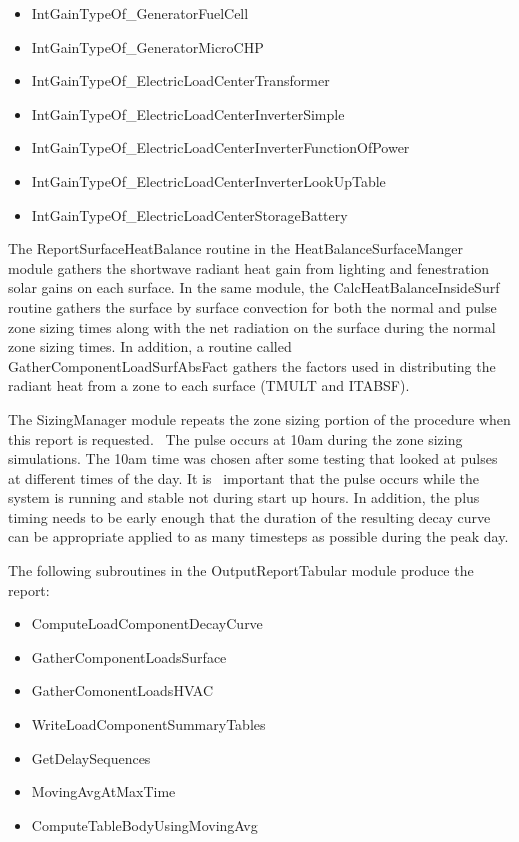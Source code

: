 \begin{itemize}
\item
  IntGainTypeOf\_GeneratorFuelCell
\item
  IntGainTypeOf\_GeneratorMicroCHP
\item
  IntGainTypeOf\_ElectricLoadCenterTransformer
\item
  IntGainTypeOf\_ElectricLoadCenterInverterSimple
\item
  IntGainTypeOf\_ElectricLoadCenterInverterFunctionOfPower
\item
  IntGainTypeOf\_ElectricLoadCenterInverterLookUpTable
\item
  IntGainTypeOf\_ElectricLoadCenterStorageBattery
\end{itemize}

The ReportSurfaceHeatBalance routine in the HeatBalanceSurfaceManger module gathers the shortwave radiant heat gain from lighting and fenestration solar gains on each surface. In the same module, the CalcHeatBalanceInsideSurf routine gathers the surface by surface convection for both the normal and pulse zone sizing times along with the net radiation on the surface during the normal zone sizing times. In addition, a routine called GatherComponentLoadSurfAbsFact gathers the factors used in distributing the radiant heat from a zone to each surface (TMULT and ITABSF).

The SizingManager module repeats the zone sizing portion of the procedure when this report is requested.~ The pulse occurs at 10am during the zone sizing simulations. The 10am time was chosen after some testing that looked at pulses at different times of the day. It is ~important that the pulse occurs while the system is running and stable not during start up hours. In addition, the plus timing needs to be early enough that the duration of the resulting decay curve can be appropriate applied to as many timesteps as possible during the peak day.

The following subroutines in the OutputReportTabular module produce the report:

\begin{itemize}
\item
  ComputeLoadComponentDecayCurve
\item
  GatherComponentLoadsSurface
\item
  GatherComonentLoadsHVAC
\item
  WriteLoadComponentSummaryTables
\item
  GetDelaySequences
\item
  MovingAvgAtMaxTime
\item
  ComputeTableBodyUsingMovingAvg
\end{itemize}

